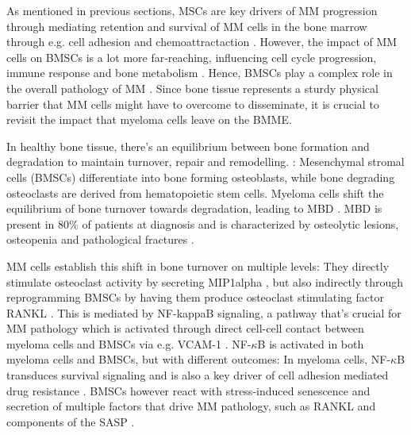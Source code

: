 %
\label{sec:intro_myeloma_hMSC_interactions}%
As mentioned in previous sections, \acp{MSC} are key drivers of \ac{MM}
progression through mediating retention and survival of \ac{MM} cells in the
bone marrow through e.g. cell adhesion and chemoattractaction
\cite{zeissigTumourDisseminationMultiple2020}. However, the impact of \ac{MM}
cells on \acp{BMSC} is a lot more far-reaching, influencing cell cycle
progression, immune response and bone metabolism
\cite{dotterweichContactMyelomaCells2016,
    fernandoTranscriptomeAnalysisMesenchymal2019}. Hence, \acp{BMSC} play a complex
role in the overall pathology of \ac{MM} \cite{mangoliniBoneMarrowStromal2020}.
Since bone tissue represents a sturdy physical barrier that \ac{MM} cells might
have to overcome to disseminate, it is crucial to revisit the impact that
myeloma cells leave on the \ac{BMME}.

In healthy bone tissue, there's an equilibrium between bone formation and
degradation to maintain turnover, repair and remodelling.
\cite{vaananenMechanismBoneTurnover1993}: Mesenchymal stromal cells (BMSCs)
differentiate into bone forming osteoblasts, while bone degrading osteoclasts
are derived from hematopoietic stem cells. Myeloma cells shift the equilibrium
of bone turnover towards degradation, leading to \ac{MBD}
\cite{hideshimaUnderstandingMultipleMyeloma2007}. MBD is present in 80\% of
patients at diagnosis and is characterized by osteolytic lesions, osteopenia and
pathological fractures \cite{terposPathogenesisBoneDisease2018}.


\ac{MM} cells establish this shift in bone turnover on multiple levels: They
directly stimulate osteoclast activity by secreting \ac{MIP1alpha}
\cite{obaMIP1alphaUtilizesBoth2005}, but also indirectly through reprogramming
\acp{BMSC} by having them produce osteoclast stimulating factor \ac{RANKL}
\cite{tsubakiHGFMetNFkB2020}. This is mediated by \ac{NF-kappaB} signaling, a
pathway that's crucial for MM pathology which is activated through direct
cell-cell contact between myeloma cells and \acp{BMSC} via e.g. \ac{VCAM-1}
\cite{cippitelliRoleNFkBSignaling2023, royNFkBActivatingPathways2018}.
NF-$\kappa$B is activated in both myeloma cells and \acp{BMSC}, but with
different outcomes: In myeloma cells, NF-$\kappa$B transduces survival signaling
and is also a key driver of cell adhesion mediated drug resistance
\cite{royNoncanonicalNFkBMutations2017, landowskiCellAdhesionmediatedDrug2003}.
\acp{BMSC} however react with stress-induced senescence and secretion of
multiple factors that drive \ac{MM} pathology, such as RANKL and components of
the \ac{SASP} \cite{chauhanMultipleMyelomaCell1996,
    fairfieldMultipleMyelomaCells2020}.


